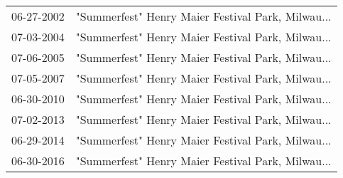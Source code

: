\begin{supertabular}{ll}
 06-27-2002 &  "Summerfest" Henry Maier Festival Park, Milwau... \\
 07-03-2004 &  "Summerfest" Henry Maier Festival Park, Milwau... \\
 07-06-2005 &  "Summerfest" Henry Maier Festival Park, Milwau... \\
 07-05-2007 &  "Summerfest" Henry Maier Festival Park, Milwau... \\
 06-30-2010 &  "Summerfest" Henry Maier Festival Park, Milwau... \\
 07-02-2013 &  "Summerfest" Henry Maier Festival Park, Milwau... \\
 06-29-2014 &  "Summerfest" Henry Maier Festival Park, Milwau... \\
 06-30-2016 &  "Summerfest" Henry Maier Festival Park, Milwau... \\
\end{supertabular}

